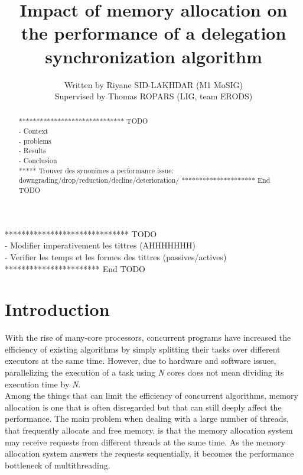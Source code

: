 \documentclass[10pt]{article}											%
\begin{document}
\title{Impact of memory allocation on the performance of a delegation synchronization algorithm}
\author{Written by Riyane SID-LAKHDAR (M1 MoSIG)\\
Supervised by Thomas ROPARS (LIG, team ERODS)}
\maketitle







\begin{abstract}
****************************** TODO\\
	- Context\\
	- problems\\
	- Results\\
	- Conclusion\\

***** Trouver des synonimes a performance issue: downgrading/drop/reduction/decline/deterioration/ 
********************* End TODO
\end{abstract}

****************************** TODO\\
	- Modifier imperativement les tittres (AHHHHHHH)\\
    - Verifier les temps et les formes des tittres (passives/actives)\\
*********************** End TODO


\section{Introduction}
With the rise of many-core processors, concurrent programs have increased the efficiency of existing algorithms by simply splitting their tasks over different executors at the same time.   However, due to hardware and software issues, parallelizing the execution of a task using \textit{N} cores does not mean dividing its execution time by \textit{N}.\\

Among the things that can limit the efficiency of concurrent algorithms, memory allocation is one that is often disregarded but that can still deeply affect the performance. The main problem when dealing with a large number of threads,  that frequently allocate and free memory, is that the memory allocation system may receive requests from different threads at the same time.   As the memory allocation system answers the requests sequentially, it becomes the performance bottleneck of multithreading.\\
\end{document}
